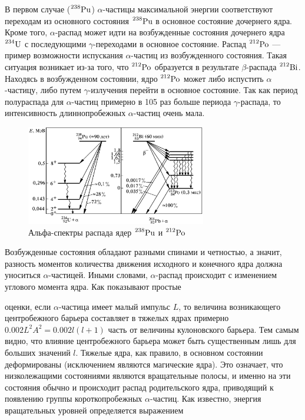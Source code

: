 \documentclass[a4paper,12pt]{article}
\begin{document}
В первом случае ($\prescript{238}{}{\text{Pu}}$) $\alpha$-частицы максимальной энергии соответствуют переходам из основного состояния $\prescript{238}{}{\text{Pu}}$ в основное состояние дочернего ядра. Кроме того, $\alpha$-распад может идти на возбужденные состояния дочернего ядра $\prescript{234}{}{\text{U}}$ с последующими $\gamma$-переходами в основное состояние. Распад $\prescript{212}{}{\text{Po}}$ — пример возможности испускания $\alpha$-частиц из возбужденного состояния. Такая ситуация возникает из-за того, что $\prescript{212}{}{\text{Po}}$ образуется в результате $\beta$-распада $\prescript{212}{}{\text{Bi}}$. Находясь в возбужденном состоянии, ядро $\prescript{212}{}{\text{Po}}$ может либо испустить $\alpha$-частицу, либо путем $\gamma$-излучения перейти в основное состояние. Так как период полураспада для $\alpha$-частиц примерно в 105 раз больше периода $\gamma$-распада, то интенсивность длиннопробежных $\alpha$-частиц очень мала.

\FloatBarrier
\begin{figure}[h]
    \begin{center}
        \includegraphics[width = 0.7\textwidth]{pics/PU_Po.png}
        \caption{Альфа-спектры распада ядер $\prescript{238}{}{\text{Pu}}$ и $\prescript{212}{}{\text{Po}}$}
    \label{pic:Pu_Po}
    \end{center}
\end{figure}
\FloatBarrier


Возбужденные состояния обладают разными спинами и четностью, а значит, разность моментов количества движения исходного и конечного ядра должна уноситься $\alpha$-частицей. Иными словами, $\alpha$-распад происходит с изменением углового момента ядра. Как показывают простые



оценки, если $\alpha$-частица имеет малый импульс $L$, то величина возникающего центробежного барьера составляет в тяжелых ядрах примерно $0.002L^2 A^2 = 0.002l(l + 1)$ часть от величины кулоновского барьера. Тем самым видно, что влияние центробежного барьера может быть существенным лишь для больших значений $l$. Тяжелые ядра, как правило, в основном состоянии деформированы (исключением являются магические ядра). Это означает, что низколежащими состояниями являются вращательные полосы, и именно на эти состояния обычно и происходит распад родительского ядра, приводящий к появлению группы короткопробежных $\alpha$-частиц. Как известно, энергия вращательных уровней определяется выражением
\end{document}
